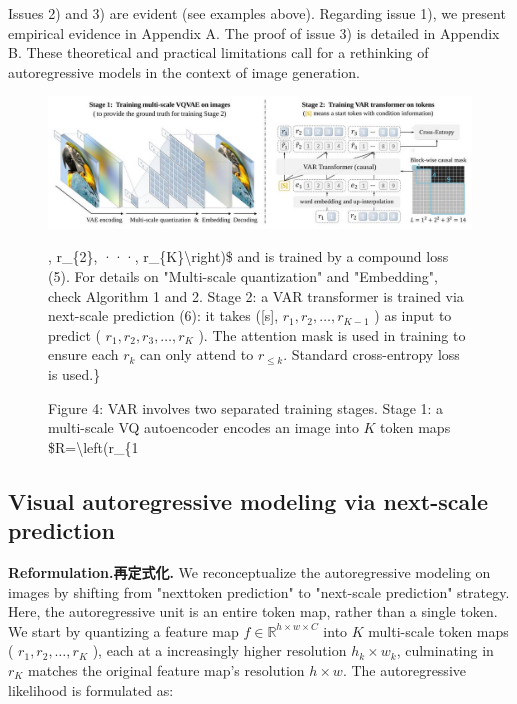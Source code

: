 \documentclass{article}
\begin{document}
Issues 2) and 3) are evident (see examples above). Regarding issue 1), we present empirical evidence in Appendix A. The proof of issue 3) is detailed in Appendix B. These theoretical and practical limitations call for a rethinking of autoregressive models in the context of image generation.

\begin{figure}[h]
\begin{center}
  \includegraphics[width=\textwidth]{2025_10_26_62f95e615e8879e267a8g-05}
\captionsetup{labelformat=empty}
\caption{Figure 4: VAR involves two separated training stages. Stage 1: a multi-scale VQ autoencoder encodes an image into $K$ token maps \$R=\textbackslash left(r\_\{1}, r\_\{2\}, ···, r\_\{K\}\textbackslash right)\$ and is trained by a compound loss (5). For details on "Multi-scale quantization" and "Embedding", check Algorithm 1 and 2. Stage 2: a VAR transformer is trained via next-scale prediction (6): it takes ([s], $r_{1}, r_{2}, \ldots, r_{K-1}$ ) as input to predict ( $r_{1}, r_{2}, r_{3}, \ldots, r_{K}$ ). The attention mask is used in training to ensure each $r_{k}$ can only attend to $r_{\leq k}$. Standard cross-entropy loss is used.\}\end{center}
\end{figure}

\subsection*{Visual autoregressive modeling via next-scale prediction}
\textbf{Reformulation.再定式化.} We reconceptualize the autoregressive modeling on images by shifting from "nexttoken prediction" to "next-scale prediction" strategy. Here, the autoregressive unit is an entire token map, rather than a single token. We start by quantizing a feature map $f \in \mathbb{R}^{h \times w \times C}$ into $K$ multi-scale token maps ( $r_{1}, r_{2}, \ldots, r_{K}$ ), each at a increasingly higher resolution $h_{k} \times w_{k}$, culminating in $r_{K}$ matches the original feature map's resolution $h \times w$. The autoregressive likelihood is formulated as:
\end{document}
